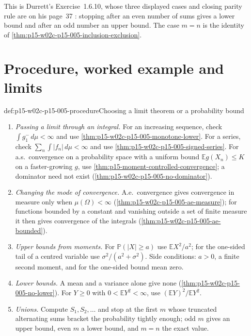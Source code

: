 This is Durrett's Exercise~1.6.10, whose three displayed cases and
closing parity rule are on his page~37
\cite[pp.~36--37]{DurrettPTEAuthor2019}: stopping after an even number
of sums gives a lower bound and after an odd number an upper bound. The
case \(m=n\) is the identity of
\cref{thm:p15-w02c-p15-005-inclusion-exclusion}.

\section{Procedure, worked example and limits}
\label{sec:p15-w02c-p15-005-procedure}

\begin{hbmethod}{def:p15-w02c-p15-005-procedure}{Choosing a limit theorem or a probability bound}
\begin{enumerate}
\item \emph{Passing a limit through an integral.} For an increasing
      sequence, check \(\int g_1^-\,d\mu<\infty\) and use
      \cref{thm:p15-w02c-p15-005-monotone-lower}. For a series, check
      \(\sum_n\int|f_n|\,d\mu<\infty\) and use
      \cref{thm:p15-w02c-p15-005-signed-series}. For a.s.\ convergence
      on a probability space with a uniform bound
      \(\mathbb Eg(X_n)\leq K\) on a faster-growing \(g\), use
      \cref{thm:p15-moment-controlled-convergence}; a dominator need not
      exist (\cref{thm:p15-w02c-p15-005-no-dominator}).
\item \emph{Changing the mode of convergence.} A.e.\ convergence gives
      convergence in measure only when \(\mu(\Omega)<\infty\)
      (\cref{thm:p15-w02c-p15-005-ae-measure}); for functions bounded
      by a constant and vanishing outside a set of finite measure it
      then gives convergence of the integrals
      (\cref{thm:p15-w02c-p15-005-ae-bounded}).
\item \emph{Upper bounds from moments.} For \(\mathbb P(|X|\geq a)\)
      use \(\mathbb EX^2/a^2\); for the one-sided tail of a centred
      variable use \(\sigma^2/(a^2+\sigma^2)\). Side conditions: \(a>0\),
      a finite second moment, and for the one-sided bound mean zero.
\item \emph{Lower bounds.} A mean and a variance alone give none
      (\cref{thm:p15-w02c-p15-005-no-lower}). For \(Y\geq0\) with
      \(0<\mathbb EY^2<\infty\), use \((\mathbb EY)^2/\mathbb EY^2\).
\item \emph{Unions.} Compute \(S_1,S_2,\ldots\) and stop at the first
      \(m\) whose truncated alternating sums bracket the probability
      tightly enough; odd \(m\) gives an upper bound, even \(m\) a lower
      bound, and \(m=n\) the exact value.
\end{enumerate}
\end{hbmethod}

